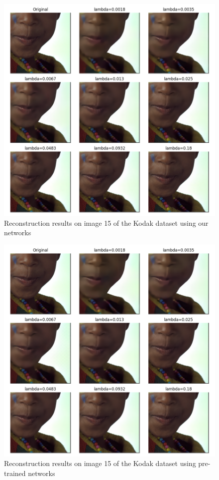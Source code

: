 \begin{figure}
    \centering
    \includegraphics[width=15cm]{img/balle_bdpsnr_2a.png}
    \caption{Reconstruction results on image 15 of the Kodak dataset using our networks}
    \label{bdpsnr_2a_app}
\end{figure}

\begin{figure}
    \centering
    \includegraphics[width=15cm]{img/balle_bdpsnr_2b.png}
    \caption{Reconstruction results on image 15 of the Kodak dataset using pre-trained networks}
    \label{bdpsnr_2b_app}
\end{figure}

